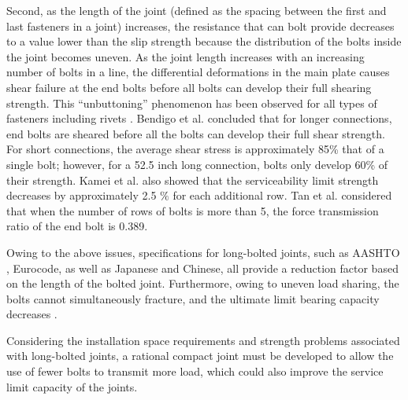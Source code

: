 Second, as the length of the joint (defined as the spacing between the first and last fasteners in a joint) increases, the resistance that can bolt provide decreases to a value lower than the slip strength because the distribution of the bolts inside the joint becomes uneven. As the joint length increases with an increasing number of bolts in a line, the differential deformations in the main plate causes shear failure at the end bolts before all bolts can develop their full shearing strength. This ``unbuttoning'' phenomenon has been observed for all types of fasteners including rivets \cite{fisher1965behavior}. Bendigo et al.\cite{bendigo1963long} concluded that for longer connections, end bolts are sheared before all the bolts can develop their full shear strength. For short connections, the average shear stress is approximately 85\% that of a single bolt; however, for a 52.5 inch long connection, bolts only develop 60\% of their strength. Kamei et al. \cite{KAMEI2000} also showed that the serviceability limit strength decreases by approximately 2.5 $\%$ for each additional row.  Tan et al.\cite{Tan2022} considered that when the number of rows of bolts is more than 5, the force transmission ratio of the end bolt is 0.389.

Owing to the above issues, specifications for long-bolted joints, such as AASHTO , Eurocode, as well as Japanese and Chinese, all provide a reduction factor based on the length of the bolted joint\cite{AASHTO2020,eccs1985,isohtb,eurocode3-21,douji2017}. Furthermore, owing to uneven load sharing, the bolts cannot simultaneously fracture, and the ultimate limit bearing capacity decreases \cite{Takai2021BoltUnbuttoning,Peng2013FeaDimensions,peng2010,longstainless2022}. 

Considering the installation space requirements and strength problems associated with long-bolted joints, a rational compact joint must be developed to allow the use of fewer bolts to transmit more load, which could also improve the service limit capacity of the joints.

